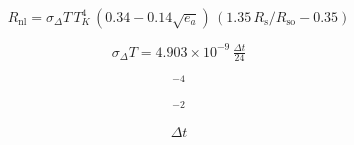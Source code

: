 \documentclass[preview,border=2pt]{standalone}
\begin{document}
\[
R_\mathrm{nl}=\sigma_\Delta T\,T_K^4\,(0.34-0.14\sqrt{e_a})\,(1.35\,R_\mathrm{s}/R_\mathrm{so}-0.35)
\]

\[
\sigma_\Delta T=4.903\times10^{-9}\,\tfrac{\Delta t}{24}
\]

\[
^{-4}
\]

\[
^{-2}
\]

\[
\Delta t
\]
\end{document}

